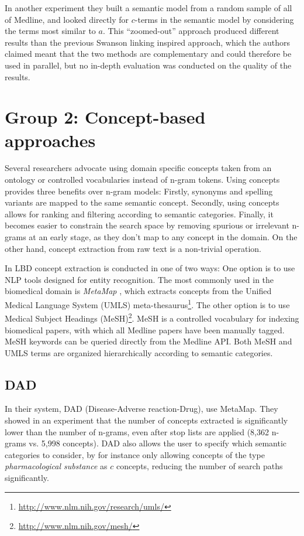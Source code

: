 In another experiment they built a semantic model from a random sample of all of Medline, and looked directly for $c$-terms in the semantic model by considering the terms most similar to $a$. 
This ``zoomed-out'' approach produced different results than the previous Swanson linking inspired approach, which the authors claimed meant that the two methods are complementary and could therefore be used in parallel, but no in-depth evaluation was conducted on the quality of the results. 

\section{Group 2: Concept-based approaches}

Several researchers advocate using domain specific concepts taken from an ontology or controlled vocabularies instead of n-gram tokens. Using concepts provides three benefits over n-gram models: Firstly, synonyms and spelling variants are mapped to the same semantic concept.  Secondly, using concepts allows for ranking and filtering according to semantic categories. Finally, it becomes easier to constrain the search space by removing spurious or irrelevant n-grams at an early stage, as they don't map to any concept in the domain. On the other hand, concept extraction from raw text is a non-trivial operation.

In LBD concept extraction is conducted in one of two ways: One option is to use NLP tools designed for entity recognition. The most commonly used in the biomedical domain is \emph{MetaMap} \cite{aro10}, which extracts concepts from the Unified Medical Language System (UMLS) meta-thesaurus\footnote{\url{http://www.nlm.nih.gov/research/umls/}}. The other option is to use Medical Subject Headings (MeSH)\footnote{\url{http://www.nlm.nih.gov/mesh/}}. MeSH is a controlled vocabulary for indexing biomedical papers, with which all Medline papers have been manually tagged. MeSH keywords can be queried directly from the Medline API. Both MeSH and UMLS terms are organized hierarchically according to semantic categories.

\subsection{DAD}

In their system, DAD (Disease-Adverse reaction-Drug), \citet{wee01} use MetaMap. They showed in an experiment that the number of concepts extracted is significantly lower than the number of n-grams, even after stop lists are applied (8,362 n-grams vs. 5,998 concepts). DAD also allows the user to specify which semantic categories to consider, by for instance only allowing concepts of the type \emph{pharmacological substance} as $c$ concepts, reducing the number of search paths significantly.


